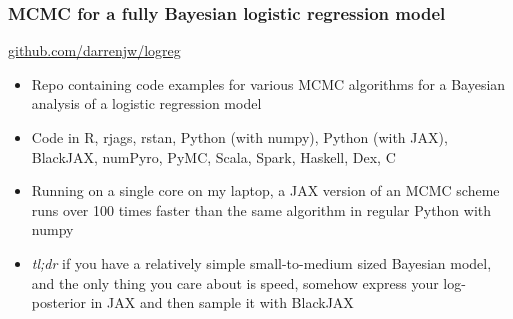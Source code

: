 \documentclass[mathserif,handout]{beamer}
\begin{document}
\begin{frame}
  \frametitle{MCMC for a fully Bayesian logistic regression model}
  \centerline{\alert{\url{github.com/darrenjw/logreg}}}
  \begin{itemize}
  \item Repo containing code examples for various MCMC algorithms for a Bayesian analysis of a logistic regression model
  \item Code in R, rjags, rstan, Python (with numpy), Python (with JAX), BlackJAX, numPyro, PyMC, Scala, Spark, Haskell, Dex, C
  \item Running on a single core on my laptop, a JAX version of an MCMC scheme runs over 100 times faster than the same algorithm in regular Python with numpy
    \item \emph{tl;dr} if you have a relatively simple small-to-medium sized Bayesian model, and the only thing you care about is speed, somehow express your log-posterior in JAX and then sample it with BlackJAX
  \end{itemize}
\end{frame}
\end{document}
